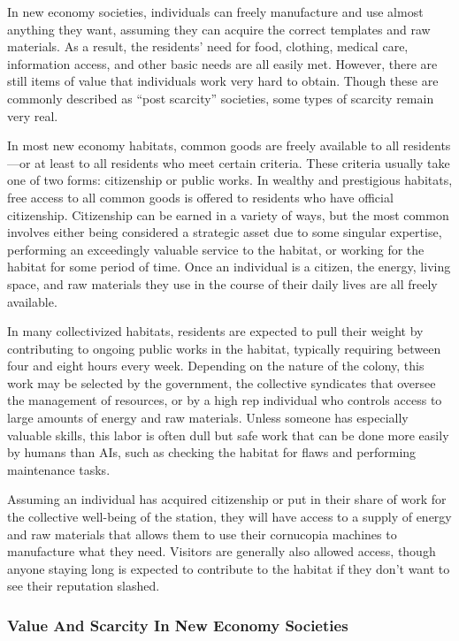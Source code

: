In new economy societies, individuals can freely 
manufacture and use almost anything they want, assuming
they can acquire the correct templates and
raw materials. As a result, the residents' need for food, 
clothing, medical care, information access, and other 
basic needs are all easily met. However, there are still 
items of value that individuals work very hard to obtain. 
Though these are commonly described as ``post scarcity'' 
societies, some types of scarcity remain very real.

In most new economy habitats, common goods 
are freely available to all residents—or at least to 
all residents who meet certain criteria. These criteria 
usually take one of two forms: citizenship or public 
works. In wealthy and prestigious habitats, free access 
to all common goods is offered to residents who have 
official citizenship. Citizenship can be earned in a 
variety of ways, but the most common involves either 
being considered a strategic asset due to some singular 
expertise, performing an exceedingly valuable service 
to the habitat, or working for the habitat for some 
period of time. Once an individual is a citizen, the 
energy, living space, and raw materials they use in the 
course of their daily lives are all freely available.

In many collectivized habitats, residents are expected
to pull their weight by contributing to ongoing
public works in the habitat, typically requiring
between four and eight hours every week. Depending 
on the nature of the colony, this work may be selected 
by the government, the collective syndicates that 
oversee the management of resources, or by a high 
rep individual who controls access to large amounts 
of energy and raw materials. Unless someone has 
especially valuable skills, this labor is often dull but 
safe work that can be done more easily by humans 
than AIs, such as checking the habitat for flaws and 
performing maintenance tasks.

Assuming an individual has acquired citizenship 
or put in their share of work for the collective well-being
of the station, they will have access to a supply
of energy and raw materials that allows them to use 
their cornucopia machines to manufacture what they 
need. Visitors are generally also allowed access, though 
anyone staying long is expected to contribute to the 
habitat if they don't want to see their reputation slashed.

\subsubsection{Value And Scarcity In New Economy Societies}

